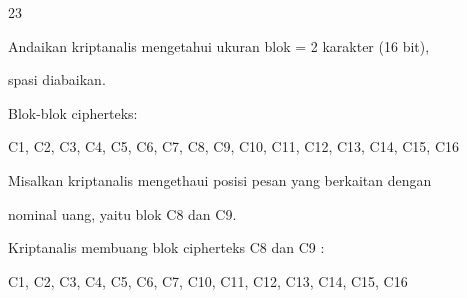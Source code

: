 \documentclass{article}
\begin{document}

23

Andaikan kriptanalis mengetahui ukuran blok = 2 karakter (16 bit), 

spasi diabaikan. 


Blok-blok cipherteks:


C1, C2, C3, C4, C5, C6, C7, C8, C9, C10, C11, C12,  C13, C14, C15, C16

Misalkan kriptanalis mengethaui posisi pesan yang berkaitan dengan 

nominal uang, yaitu blok C8 dan C9. 

Kriptanalis membuang blok cipherteks C8 dan C9 : 


C1, C2, C3, C4, C5, C6, C7, C10, C11, C12, C13, C14, C15, C16
\end{document}
